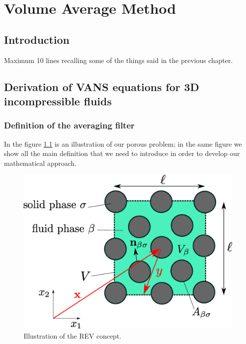 \chapter{Volume Average Method}
\label{ch:vans}


\section{Introduction}

Maximum 10 lines recalling some of the things said in the previous chapter.

\section{Derivation of VANS equations for 3D incompressible fluids}
%

\subsection{Definition of the averaging filter}

In the figure \ref{fig:rev} is an illustration of our porous problem; in the same figure we show all the main definition that we need to introduce in order to develop our mathematical approach.


\begin{figure}[h]
	\centering
	\includegraphics[width=0.7\linewidth]{chapter_2/figure/REV}
	\caption{Illustration of the REV concept.}
	\label{fig:rev}
\end{figure}

